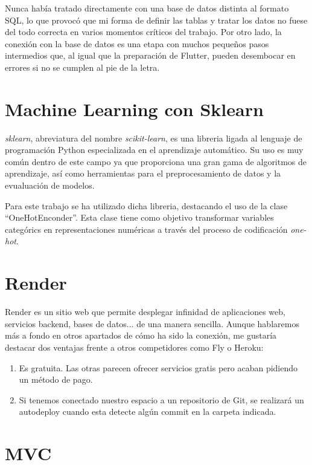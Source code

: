 	Nunca había tratado directamente con una base de datos distinta al formato SQL, lo que provocó que mi forma de definir las tablas y tratar los datos no fuese del todo correcta en varios momentos críticos del trabajo. Por otro lado, la conexión con la base de datos es una etapa con muchos pequeños pasos intermedios que, al igual que la preparación de Flutter, pueden desembocar en errores si no se cumplen al pie de la letra.


\section{Machine Learning con Sklearn}

	\emph{sklearn}, abreviatura del nombre \emph{scikit-learn}, es una libreria ligada al lenguaje de programación Python especializada en el aprendizaje automático. Su uso es muy común dentro de este campo ya que proporciona una gran gama de algoritmos de aprendizaje, así como herramientas para el preprocesamiento de datos y la evualuación de modelos.
	
	Para este trabajo se ha utilizado dicha libreria, destacando el uso de la clase ``OneHotEnconder''. Esta clase tiene como objetivo transformar variables categórics en representaciones numéricas a través del proceso de codificación \emph{one-hot}.
	
\section{Render}

	Render es un sitio web que permite desplegar infinidad de aplicaciones web, servicios backend, bases de datos... de una manera sencilla. Aunque hablaremos más a fondo en otros apartados de cómo ha sido la conexión, me gustaría destacar dos ventajas frente a otros competidores como Fly o Heroku:
	\begin{enumerate}
		\item Es gratuita. Las otras parecen ofrecer servicios gratis pero acaban pidiendo un método de pago.
		\item Si tenemos conectado nuestro espacio a un repositorio de Git, se realizará un autodeploy cuando esta detecte algún commit en la carpeta indicada.
	\end{enumerate}
	
\section{MVC}

